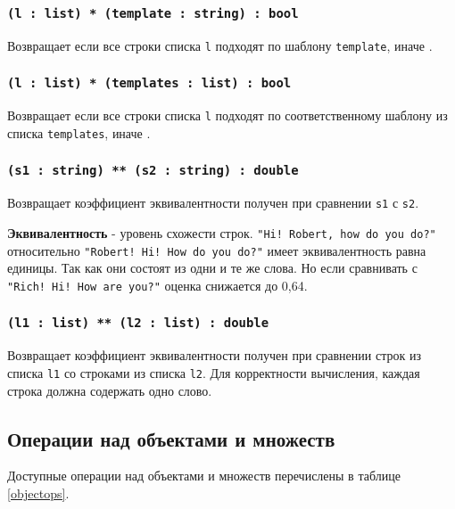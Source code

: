 \subsubsection{\texttt{(l : list) * (template : string) : bool}}

Возвращает \true{} если все строки списка \texttt{l} подходят по шаблону \texttt{template}, иначе \false{}.

\subsubsection{\texttt{(l : list) * (templates : list) : bool}}

Возвращает \true{} если все строки списка \texttt{l} подходят по соответственному шаблону из списка \texttt{templates}, иначе \false{}.

\subsubsection{\texttt{(s1 : string) ** (s2 : string) : double}}

Возвращает коэффициент эквивалентности получен при сравнении \texttt{s1} с \texttt{s2}.

{\bf Эквивалентность} - уровень схожести строк. \texttt{"Hi! Robert, how do you do?"} относительно \texttt{"Robert! Hi! How do you do?"} имеет эквивалентность равна единицы. Так как они состоят из одни и те же слова. Но если сравнивать с  \texttt{"Rich! Hi! How are you?"} оценка снижается до 0,64.

\subsubsection{\texttt{(l1 : list) ** (l2 : list) : double}}

Возвращает коэффициент эквивалентности получен при сравнении строк из списка \texttt{l1} со строками из списка \texttt{l2}.
Для корректности вычисления, каждая строка должна содержать одно слово.

\subsection{Операции над объектами и множеств}

Доступные операции над объектами и множеств перечислены в таблице \ref{objectops}.

